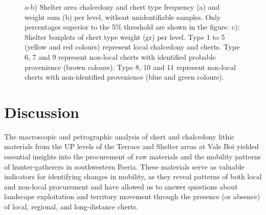 \documentclass[
  a4paper,
  DIV=11,
  numbers=noendperiod]{scrreprt}
\begin{document}
\begin{figure}


\caption{\label{fig-analysis_shelter}a-b) Shelter area chalcedony and
chert type frequency (a) and weight sum (b) per level, without
unidentifiable samples. Only percentages superior to the 5\% threshold
are shown in the figure. c): Shelter boxplots of chert type weight (gr)
per level. Type 1 to 5 (yellow and red colours) represent local
chalcedony and cherts. Type 6, 7 and 9 represent non-local cherts with
identified probable provenience (brown colours). Type 8, 10 and 11
represent non-local cherts with non-identified provenience (blue and
green colours).}

\end{figure}%

\section{Discussion}\label{discussion-1}

The macroscopic and petrographic analysis of chert and chalcedony lithic
materials from the UP levels of the Terrace and Shelter areas at Vale
Boi yielded essential insights into the procurement of raw materials and
the mobility patterns of hunter-gatherers in southwestern Iberia. These
materials serve as valuable indicators for identifying changes in
mobility, as they reveal patterns of both local and non-local
procurement and have allowed us to answer questions about landscape
exploitation and territory movement through the presence (or absence) of
local, regional, and long-distance cherts.
\end{document}
